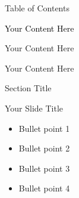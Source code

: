 \documentclass[aspectratio=1610, 12pt]{beamer}
\begin{document}
\begin{frame}[plain]    
    \titlepage
\end{frame}

\begin{frame}{Table of Contents}
    \tableofcontents
\end{frame}

\begin{frame}
    \begin{center}
        \textcolor{black}{\Huge Your Content Here}
    \end{center}
\end{frame}

\begin{frame}
    \begin{center}
        \textcolor{TertiaryColorTheme}{\Huge Your Content Here}
    \end{center}
\end{frame}

\begin{frame}
    \begin{center}
        \textcolor{MainColorTheme}{\Huge Your Content Here}
    \end{center}
\end{frame}

\begin{frame}[plain]
    \vfill
    \centering
    \textcolor{MainColorTheme}{\Huge Section Title}
    \vfill
\end{frame}

\begin{frame}{Your Slide Title}
    \begin{itemize}
        \item Bullet point 1
        \item Bullet point 2
        \item Bullet point 3
        \item Bullet point 4
    \end{itemize}
\end{frame}
\end{document}
